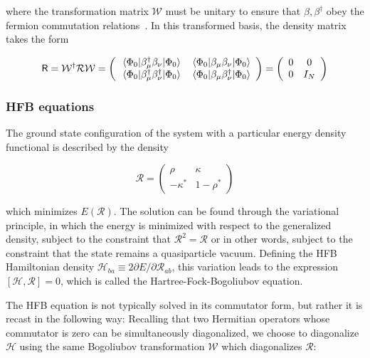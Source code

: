 \noindent where the transformation matrix $\mathcal{W}$ must be unitary to ensure that $\beta, \beta^\dagger$ obey the fermion commutation relations~\cite{Ring1980}. In this transformed basis, the density matrix takes the form 

\begin{equation}
\mathsf{R} = \mathcal{W}^\dagger\mathcal{R}\mathcal{W} = 
\left(\begin{array}{cc}
\expval{\beta_\mu^\dagger \beta_\nu}{\Phi_0} & \expval{\beta_\mu \beta_\nu}{\Phi_0} \\
\expval{\beta_\mu^\dagger \beta_\nu^\dagger}{\Phi_0} & \expval{\beta_\mu \beta_\nu^\dagger}{\Phi_0}
\end{array}\right) = 
\left(\begin{array}{cc}
0 & 0 \\
0 & I_N
\end{array}\right)
\end{equation}


\subsubsection{HFB equations}

The ground state configuration of the system with a particular energy density functional is described by the density

\begin{equation}
\mathcal{R} = \left(\begin{array}{cc}
\rho & \kappa \\
-\kappa^* & 1-\rho^*
\end{array}\right)
\end{equation}

\noindent which minimizes $E(\mathcal{R})$. The solution can be found through the variational principle, in which the energy is minimized with respect to the generalized density, subject to the constraint that $\mathcal{R}^2=\mathcal{R}$ \textminus or in other words, subject to the constraint that the state remains a quasiparticle vacuum. Defining the HFB Hamiltonian density $\mathcal{H}_{ba} \equiv 2 \partial E/\partial \mathcal{R}_{ab}$, this variation leads to the expression $\left[\mathcal{H},\mathcal{R}\right]=0$, which is called the Hartree-Fock-Bogoliubov equation.

The HFB equation is not typically solved in its commutator form, but rather it is recast in the following way: Recalling that two Hermitian operators whose commutator is zero can be simultaneously diagonalized, we choose to diagonalize $\mathcal{H}$ using the same Bogoliubov transformation $\mathcal{W}$ which diagonalizes $\mathcal{R}$:

